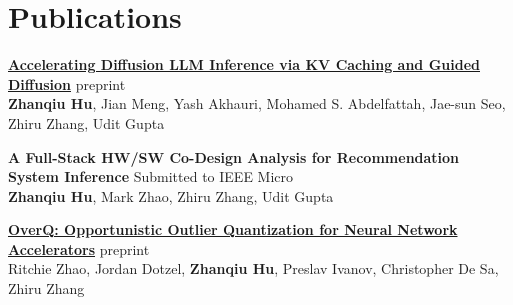 \documentclass[letterpaper,10pt]{article}
\makeatletter
\newcommand{\resumeItem}[1]{
  \item\normalsize{#1 \vspace{-2pt}}
}
\newcommand{\resumeSubheading}[4]{
  \vspace{-3pt}\item
    \begin{tabular*}{0.97\textwidth}[t]{l@{\extracolsep{\fill}}r}
      \textbf{#1} & #2 \\
      \normalsize#3 & \normalsize #4 \\
    \end{tabular*}\vspace{-4pt}
}
\newcommand{\resumeSubHeadingListStart}{\begin{itemize}[leftmargin=0.1in, label={}, itemsep=0.5em]}
\newcommand{\resumeSubHeadingListEnd}{\end{itemize}}
\newcommand{\resumeItemListStart}{\begin{itemize}[leftmargin=0.15in, label=$\bullet$, topsep=2pt, itemsep=0.2em, parsep=0pt]}
\newcommand{\resumeItemListEnd}{\end{itemize}\vspace{0pt}}
\newcommand{\publicationCompact}[3]{
    \textbf{#1} \hfill #3 \\
    #2
    \vspace{4pt}
}
\makeatother
\begin{document}
\section{Publications}
\vspace{2pt}

% 
% 

\publicationCompact{\href{https://arxiv.org/abs/2505.21467}{Accelerating Diffusion LLM Inference via KV Caching and Guided Diffusion}}{\textbf{Zhanqiu Hu}, Jian Meng, Yash Akhauri, Mohamed S. Abdelfattah, Jae-sun Seo, Zhiru Zhang, Udit Gupta}{preprint}

\publicationCompact{A Full-Stack HW/SW Co-Design Analysis for Recommendation System Inference}{\textbf{Zhanqiu Hu}, Mark Zhao, Zhiru Zhang, Udit Gupta}{Submitted to IEEE Micro}

\publicationCompact{\href{https://arxiv.org/abs/1910.06909}{OverQ: Opportunistic Outlier Quantization for Neural Network Accelerators}}{Ritchie Zhao, Jordan Dotzel, \textbf{Zhanqiu Hu}, Preslav Ivanov, Christopher De Sa, Zhiru Zhang}{preprint}

\end{document}
